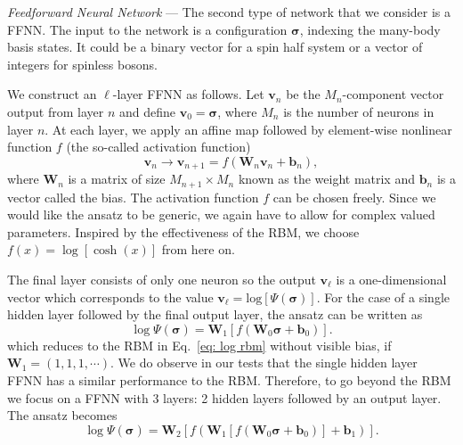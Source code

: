 \documentclass[aps,prl,twocolumn,amsmath,amssymb,superscriptaddress,floatfix]{revtex4-1}
\begin{document}
\textit{Feedforward Neural Network} ---
The second type of network that we consider is a FFNN. The input to the network is a configuration $\boldsymbol{\sigma}$, indexing the many-body basis states. It could be a binary vector for a spin half system or a vector of integers for spinless bosons. 

We construct an $\ell$-layer FFNN as follows. Let $\boldsymbol{v}_{n}$ be the $M_n$-component vector output from layer $n$ and define $\boldsymbol{v}_{0} = \boldsymbol{\sigma}$, where $M_n$ is the number of neurons in layer $n$. At each layer, we apply an affine map followed by element-wise nonlinear function $f$ (the so-called activation function)
\begin{equation}\label{feedforward}
\boldsymbol{v}_{n} \rightarrow \boldsymbol{v}_{n+1} =f\left(\boldsymbol{W}_{n}\boldsymbol{v}_{n} + \boldsymbol{b}_{n}\right),
\end{equation}
where $\boldsymbol{W}_{n}$ is a matrix of size $M_{n+1}\times M_{n}$ known as the weight matrix and $\boldsymbol{b}_{n}$ is a vector called the bias. The activation function $f$ can be chosen freely. Since we would like the ansatz to be generic, we again have to allow for complex valued parameters. Inspired by the effectiveness of the RBM, we choose
$
f(x) = \log\left[\cosh(x)\right]
$ from here on.

The final layer consists of only one neuron so the output $\boldsymbol{v}_{\ell}$ is a one-dimensional vector which corresponds to the value $\boldsymbol{v}_{\ell} = \textrm{log}\left[\Psi(\boldsymbol{\sigma})\right]$. For the case of a single hidden layer followed by the final output layer, the ansatz can be written as
\begin{equation}
\log{\Psi(\boldsymbol{\sigma})} = \boldsymbol{W}_{1}[f( \boldsymbol{W}_{0}\boldsymbol{\sigma} + \boldsymbol{b}_{0})].
\end{equation}
which reduces to the RBM in Eq.~\eqref{eq: log rbm} without visible bias, if  $\boldsymbol{W}_1=(1,1,1,\cdots)$. We do observe in our tests that the single hidden layer FFNN has a similar performance to the RBM. Therefore, to go beyond the RBM we focus on a FFNN with 3 layers: 2 hidden layers followed by an output layer. The ansatz becomes
\begin{equation} \label{eq: FFNN}
\log{\Psi(\boldsymbol{\sigma})} = \boldsymbol{W}_{2}[f( \boldsymbol{W}_{1}[f(\boldsymbol{W}_{0}\boldsymbol{\sigma} + \boldsymbol{b}_{0})]+ \boldsymbol{b}_{1})].
\end{equation}
\end{document}

